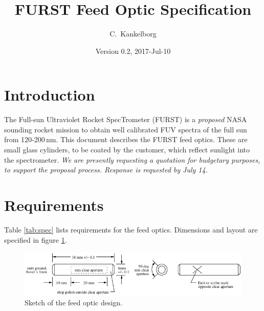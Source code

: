 \documentclass[12pt]{article}
\title{FURST Feed Optic Specification}
\date{Version 0.2, 2017-Jul-10}
\author{C.\ Kankelborg}
\begin{document}
\maketitle

\section{Introduction}

The Full-sun Ultraviolet Rocket SpecTrometer (FURST) is a \emph{proposed} NASA sounding rocket mission to obtain well calibrated FUV spectra of the full sun from 120-200\,nm. This document describes the FURST feed optics. These are small glass cylinders, to be coated by the customer, which reflect sunlight into the spectrometer. \emph{We are presently requesting a quotation for budgetary purposes, to support the proposal process. Response is requested by July 14.}



\section{Requirements}
Table \ref{tab:spec} lists requirements for the feed optics. Dimensions and layout are specified in figure \ref{fig:cylinder}. 

\begin{figure}
   \begin{center}
      \includegraphics[width=0.95\textheight, angle=90]{cylinder.pdf}
   \end{center}
   \caption{Sketch of the feed optic design.}\label{fig:cylinder}
\end{figure}
\end{document}
